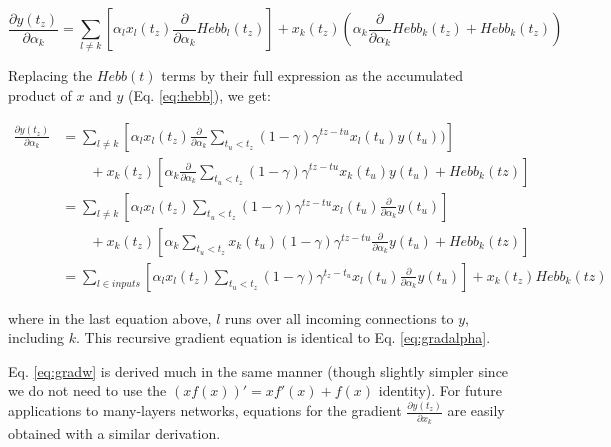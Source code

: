 \documentclass{article}
\begin{document}
\[
\frac{\partial y(t_z)}{\partial \alpha_k} = \sum_{l \neq k }[\alpha_l
x_l(t_z)\frac{\partial }{\partial \alpha_k}Hebb_l(t_z)] +
x_k(t_z)(\alpha_k\frac{\partial }{\partial \alpha_k}Hebb_k(t_z) + Hebb_k(t_z))
\]

Replacing the $Hebb(t)$ terms by their full expression as the accumulated product of $x$ and
$y$ (Eq. \ref{eq:hebb}), we get:

\begin{align}
\frac{\partial y(t_z)}{\partial \alpha_k} &= \sum_{l \neq k }[\alpha_l x_l(t_z) \frac{\partial }{\partial
\alpha_k}\sum_{t_u < t_z}(1-\gamma)\gamma^{tz-tu}x_l(t_u)y(t_u))] \nonumber \\ 
& \qquad {} + x_k(t_z)[\alpha_k\frac{\partial}{\partial \alpha_k}\sum_{t_u <
t_z}(1-\gamma)\gamma^{tz-tu}x_k(t_u)y(t_u) + Hebb_k(tz)]\\
&= \sum_{l \neq k }[\alpha_l x_l(t_z) \sum_{t_u < t_z}(1-\gamma)\gamma^{tz-tu}x_l(t_u)\frac{\partial }{\partial
\alpha_k}y(t_u)] \nonumber \\
& \qquad {} + x_k(t_z)[\alpha_k\sum_{t_u <
t_z}x_k(t_u)(1-\gamma)\gamma^{tz-tu}\frac{\partial}{\partial \alpha_k}y(t_u) + Hebb_k(tz)]\\
&= \sum_{l \in inputs}[\alpha_l x_l(t_z)\sum_{t_u <
t_z}(1-\gamma)\gamma^{t_z-t_u}x_l(t_u)\frac{\partial
}{\partial
\alpha_k}y(t_u)] +
x_k(t_z)Hebb_k(tz)
\end{align}


where in the last equation above, $l$ runs over all incoming connections to $y$,
including $k$. This recursive gradient equation is identical to Eq.
\ref{eq:gradalpha}.

Eq. \ref{eq:gradw} is derived much in the same manner (though slightly simpler
since we do not need to use the $(xf(x))'=xf'(x)+f(x)$ identity). For future applications to
many-layers networks, equations for the gradient
$\frac{\partial y(t_z)}{\partial x_k}$ are easily obtained with a similar
derivation.

\small
\printbibliography
\end{document}
